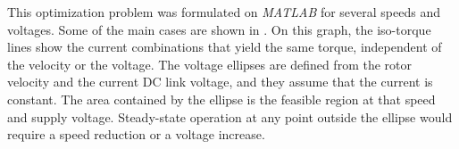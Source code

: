 This optimization problem was formulated on \textit{MATLAB} for several speeds and voltages. Some of the main cases are shown in . On this graph, the iso-torque lines show the current combinations that yield the same torque, independent of the velocity or the voltage. The voltage ellipses are defined from the rotor velocity and the current DC link voltage, and they assume that the current is constant. The area contained by the ellipse is the feasible region at that speed and supply voltage. Steady-state operation at any point outside the ellipse would require a speed reduction or a voltage increase.
